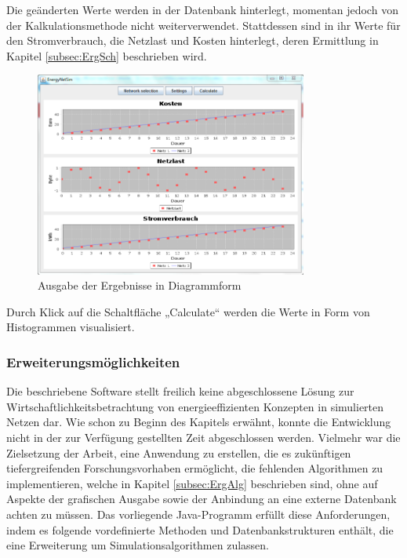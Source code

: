 \documentclass[12pt,titlepage]{article}
\begin{document}
Die geänderten Werte werden in der Datenbank hinterlegt, momentan jedoch von der Kalkulationsmethode nicht weiterverwendet. Stattdessen sind in ihr Werte für den Stromverbrauch, die Netzlast und Kosten hinterlegt, deren Ermittlung in Kapitel \ref{subsec:ErgSch} beschrieben wird.
\begin{figure}[!ht]
	\centering
	\includegraphics[width=0.8\textwidth]{ErgSoftwareUse4}
	\caption{Ausgabe der Ergebnisse in Diagrammform}
	\label{fig:ErgSoftwareUse4}
\end{figure}
Durch Klick auf die Schaltfläche „Calculate“ werden die Werte in Form von Histogrammen visualisiert.

\subsubsection{Erweiterungsmöglichkeiten} \label{sec:ErgSoftwErweiterung}
Die beschriebene Software stellt freilich keine abgeschlossene Lösung zur Wirtschaftlichkeitsbetrachtung von energieeffizienten Konzepten in simulierten Netzen dar. Wie schon zu Beginn des Kapitels erwähnt, konnte die Entwicklung nicht in der zur Verfügung gestellten Zeit abgeschlossen werden. Vielmehr war die Zielsetzung der Arbeit, eine Anwendung zu erstellen, die es zukünftigen tiefergreifenden Forschungsvorhaben ermöglicht, die fehlenden Algorithmen zu implementieren, welche in Kapitel \ref{subsec:ErgAlg} beschrieben sind, ohne auf Aspekte der grafischen Ausgabe sowie der Anbindung an eine externe Datenbank achten zu müssen.
Das vorliegende Java-Programm erfüllt diese Anforderungen, indem es folgende vordefinierte Methoden und Datenbankstrukturen enthält, die eine Erweiterung um Simulationsalgorithmen zulassen.
\end{document}
